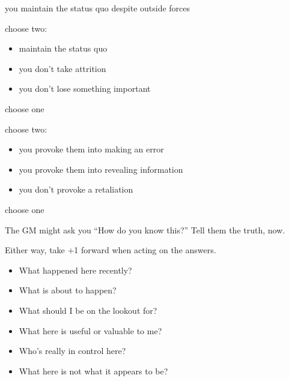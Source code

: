{you maintain the status quo despite outside forces}
{choose two:
\begin{itemize}
\item maintain the status quo
\item you don't take attrition
\item you don't lose something important
\end{itemize}}
{choose one}

{choose two:
\begin{itemize}
\item you provoke them into making an error
\item you provoke them into revealing information
\item you don't provoke a retaliation
\end{itemize}}
{choose one}


The GM might ask you ``How do you know this?'' Tell them the truth, now.


Either way, take +1 forward when acting on the answers.

\begin{itemize}
\item What happened here recently?
\item What is about to happen?
\item What should I be on the lookout for?
\item What here is useful or valuable to me?
\item Who's really in control here?
\item What here is not what it appears to be?
\end{itemize}

